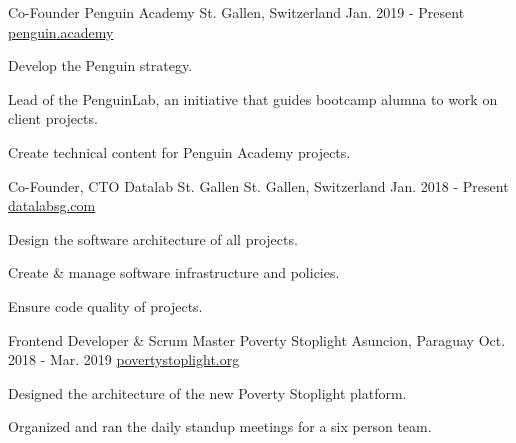 
\begin{cventries}
  \cventry
    {Co-Founder} %
    {Penguin Academy} %
    {St. Gallen, Switzerland} %
    {Jan. 2019 - Present} %
    {\href{https://penguin.academy}{penguin.academy}} %
    {
      \begin{cvitems} %
      \item {Develop the Penguin strategy.}
      \item {Lead of the PenguinLab, an initiative that guides bootcamp alumna to work on client projects.}
      \item {Create technical content for Penguin Academy projects.}
      \end{cvitems}
    }
  \cventry
    {Co-Founder, CTO} %
    {Datalab St. Gallen} %
    {St. Gallen, Switzerland} %
    {Jan. 2018 - Present} %
    {\href{https://datalabsg.com}{datalabsg.com}} %
    {
      \begin{cvitems} %
      \item {Design the software architecture of all projects.}
      \item {Create \& manage software infrastructure and policies.}
      \item {Ensure code quality of projects.}
      \end{cvitems}
    }
  \cventry
    {Frontend Developer \& Scrum Master} %
    {Poverty Stoplight} %
    {Asuncion, Paraguay} %
    {Oct. 2018 - Mar. 2019} %
    {\href{https://povertystoplight.org}{povertystoplight.org}} %
    {
      \begin{cvitems} %
      \item {Designed the architecture of the new Poverty Stoplight platform.}
      \item {Organized and ran the daily standup meetings for a six person team.}

\end{cvitems}}
\end{cventries}
